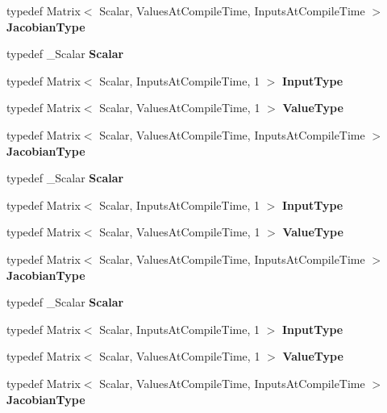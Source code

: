 \begin{DoxyCompactItemize}
typedef Matrix$<$ Scalar, Values\+At\+Compile\+Time, Inputs\+At\+Compile\+Time $>$ {\bfseries Jacobian\+Type}
\item 
\mbox{\label{struct_test_func1_aaa929c4e8eb082e65e2b8fecb4d4025f}} 
typedef \+\_\+\+Scalar {\bfseries Scalar}
\item 
\mbox{\label{struct_test_func1_a35f245162f06a1363c9dcbcb4729dd7e}} 
typedef Matrix$<$ Scalar, Inputs\+At\+Compile\+Time, 1 $>$ {\bfseries Input\+Type}
\item 
\mbox{\label{struct_test_func1_a73cc5db75fb583fadd7e2f7d7b736ed5}} 
typedef Matrix$<$ Scalar, Values\+At\+Compile\+Time, 1 $>$ {\bfseries Value\+Type}
\item 
\mbox{\label{struct_test_func1_a7d784c423cd16d95e9c7af75316d0155}} 
typedef Matrix$<$ Scalar, Values\+At\+Compile\+Time, Inputs\+At\+Compile\+Time $>$ {\bfseries Jacobian\+Type}
\item 
\mbox{\label{struct_test_func1_aaa929c4e8eb082e65e2b8fecb4d4025f}} 
typedef \+\_\+\+Scalar {\bfseries Scalar}
\item 
\mbox{\label{struct_test_func1_a35f245162f06a1363c9dcbcb4729dd7e}} 
typedef Matrix$<$ Scalar, Inputs\+At\+Compile\+Time, 1 $>$ {\bfseries Input\+Type}
\item 
\mbox{\label{struct_test_func1_a73cc5db75fb583fadd7e2f7d7b736ed5}} 
typedef Matrix$<$ Scalar, Values\+At\+Compile\+Time, 1 $>$ {\bfseries Value\+Type}
\item 
\mbox{\label{struct_test_func1_a7d784c423cd16d95e9c7af75316d0155}} 
typedef Matrix$<$ Scalar, Values\+At\+Compile\+Time, Inputs\+At\+Compile\+Time $>$ {\bfseries Jacobian\+Type}
\item 
\mbox{\label{struct_test_func1_aaa929c4e8eb082e65e2b8fecb4d4025f}} 
typedef \+\_\+\+Scalar {\bfseries Scalar}
\item 
\mbox{\label{struct_test_func1_a35f245162f06a1363c9dcbcb4729dd7e}} 
typedef Matrix$<$ Scalar, Inputs\+At\+Compile\+Time, 1 $>$ {\bfseries Input\+Type}
\item 
\mbox{\label{struct_test_func1_a73cc5db75fb583fadd7e2f7d7b736ed5}} 
typedef Matrix$<$ Scalar, Values\+At\+Compile\+Time, 1 $>$ {\bfseries Value\+Type}
\item 
\mbox{\label{struct_test_func1_a7d784c423cd16d95e9c7af75316d0155}} 
typedef Matrix$<$ Scalar, Values\+At\+Compile\+Time, Inputs\+At\+Compile\+Time $>$ {\bfseries Jacobian\+Type}
\end{DoxyCompactItemize}
